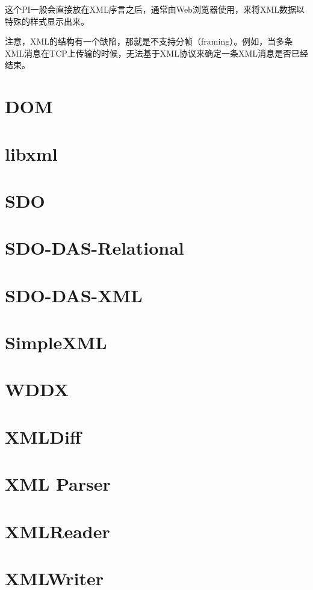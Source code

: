 这个PI一般会直接放在XML序言之后，通常由Web浏览器使用，来将XML数据以特殊的样式显示出来。

注意，XML的结构有一个缺陷，那就是不支持分帧（framing）。例如，当多条XML消息在TCP上传输的时候，无法基于XML协议来确定一条XML消息是否已经结束。


\section{DOM}


\section{libxml}


\section{SDO}


\section{SDO-DAS-Relational}


\section{SDO-DAS-XML}


\section{SimpleXML}


\section{WDDX}


\section{XMLDiff}


\section{XML Parser}


\section{XMLReader}


\section{XMLWriter}


